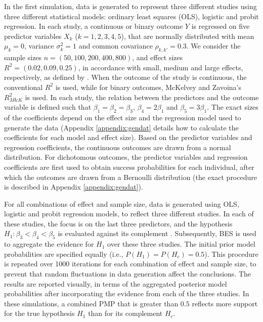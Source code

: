 \documentclass[11pt,reqno]{article}
\begin{document}
In the first simulation, data is generated to represent three different studies using three different statistical models: ordinary least squares (OLS), logistic and probit regression.
In each study, a continuous or binary outcome $Y$ is regressed on five predictor variables $X_k$ ($k = 1,2,3,4,5$), that are normally distributed with mean $\mu_k = 0$, variance $\sigma^2_{k} = 1$ and common covariance $\rho_{k,k'} = 0.3$.
We consider the sample sizes $n = (50, 100, 200, 400, 800)$, and effect sizes $R^2 = (0.02, 0.09, 0.25)$, in accordance with small, medium and large effects, respectively, as defined by \citet{cohen_1988}.
When the outcome of the study is continuous, the conventional $R^2$ is used, while for binary outcomes, McKelvey and Zavoina's $R^2_{M\&K}$ \citep*{mckelvey_zavoina_1975} is used.
In each study, the relation between the predictors and the outcome variable is defined such that $\beta_1 = \beta_2 = \beta_3$, $\beta_4 = 2 \beta_1$ and $\beta_5 = 3\beta_1$.
The exact sizes of the coefficients depend on the effect size and the regression model used to generate the data (Appendix \ref{appendix:gendat} details how to calculate the coefficients for each model and effect size).
Based on the predictor variables and regression coefficients, the continuous outcomes are drawn from a normal distribution.
For dichotomous outcomes, the predictor variables and regression coefficients are first used to obtain success probabilities for each individual, after which the outcomes are drawn from a Bernoulli distribution (the exact procedure is described in Appendix \ref{appendix:gendat}).

For all combinations of effect and sample size, data is generated using OLS, logistic and probit regression models, to reflect three different studies.
In each of these studies, the focus is on the last three predictors, and the hypothesis $H_1: \beta_3 < \beta_4 < \beta_5$ is evaluated against its complement \citep[using the \texttt{BF()} function from the \texttt{R}-package \texttt{BFpack}, with default (prior) settings;][Version 1.0.0]{BFpack}.
Subsequently, BES is used to aggregate the evidence for $H_1$ over these three studies.
The initial prior model probabilities are specified equally (i.e., $P(H_1) = P(H_{c}) = 0.5$).
This procedure is repeated over 1000 iterations for each combination of effect and sample size, to prevent that random fluctuations in data generation affect the conclusions.
The results are reported visually, in terms of the aggregated posterior model probabilities after incorporating the evidence from each of the three studies.
In these simulations, a combined PMP that is greater than $0.5$ reflects more support for the true hypothesis $H_1$ than for its complement $H_c$.
\end{document}
